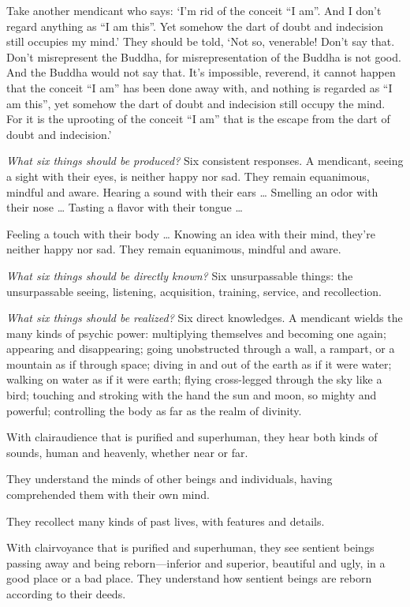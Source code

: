 \documentclass[12pt,openany]{book}%
\begin{document}
Take another mendicant who says: ‘I’m rid of the conceit “I am”. And I don’t regard anything as “I am this”. Yet somehow the dart of doubt and indecision still occupies my mind.’ They should be told, ‘Not so, venerable! Don’t say that. Don’t misrepresent the Buddha, for misrepresentation of the Buddha is not good. And the Buddha would not say that. It’s impossible, reverend, it cannot happen that the conceit “I am” has been done away with, and nothing is regarded as “I am this”, yet somehow the dart of doubt and indecision still occupy the mind. For it is the uprooting of the conceit “I am” that is the escape from the dart of doubt and indecision.’ 

\emph{What six things should be produced?} Six consistent responses. A mendicant, seeing a sight with their eyes, is neither happy nor sad. They remain equanimous, mindful and aware. Hearing a sound with their ears … Smelling an odor with their nose … Tasting a flavor with their tongue … 

Feeling a touch with their body … Knowing an idea with their mind, they’re neither happy nor sad. They remain equanimous, mindful and aware. 

\emph{What six things should be directly known?} Six unsurpassable things: the unsurpassable seeing, listening, acquisition, training, service, and recollection. 

\emph{What six things should be realized?} Six direct knowledges. A mendicant wields the many kinds of psychic power: multiplying themselves and becoming one again; appearing and disappearing; going unobstructed through a wall, a rampart, or a mountain as if through space; diving in and out of the earth as if it were water; walking on water as if it were earth; flying cross-legged through the sky like a bird; touching and stroking with the hand the sun and moon, so mighty and powerful; controlling the body as far as the realm of divinity. 

With clairaudience that is purified and superhuman, they hear both kinds of sounds, human and heavenly, whether near or far. 

They understand the minds of other beings and individuals, having comprehended them with their own mind. 

They recollect many kinds of past lives, with features and details. 

With clairvoyance that is purified and superhuman, they see sentient beings passing away and being reborn—inferior and superior, beautiful and ugly, in a good place or a bad place. They understand how sentient beings are reborn according to their deeds. 
\end{document}
